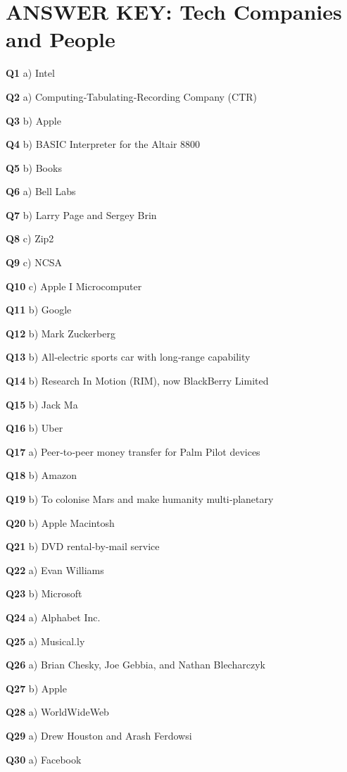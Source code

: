 \section{ANSWER KEY: Tech Companies and People}

\textbf{Q1} a) Intel\par
\textbf{Q2} a) Computing‑Tabulating‑Recording Company (CTR)\par
\textbf{Q3} b) Apple\par
\textbf{Q4} b) BASIC Interpreter for the Altair 8800\par
\textbf{Q5} b) Books\par
\textbf{Q6} a) Bell Labs\par
\textbf{Q7} b) Larry Page and Sergey Brin\par
\textbf{Q8} c) Zip2\par
\textbf{Q9} c) NCSA\par
\textbf{Q10} c) Apple I Microcomputer\par
\textbf{Q11} b) Google\par
\textbf{Q12} b) Mark Zuckerberg\par
\textbf{Q13} b) All‑electric sports car with long‑range capability\par
\textbf{Q14} b) Research In Motion (RIM), now BlackBerry Limited\par
\textbf{Q15} b) Jack Ma\par
\textbf{Q16} b) Uber\par
\textbf{Q17} a) Peer‑to‑peer money transfer for Palm Pilot devices\par
\textbf{Q18} b) Amazon\par
\textbf{Q19} b) To colonise Mars and make humanity multi‑planetary\par
\textbf{Q20} b) Apple Macintosh\par
\textbf{Q21} b) DVD rental‑by‑mail service\par
\textbf{Q22} a) Evan Williams\par
\textbf{Q23} b) Microsoft\par
\textbf{Q24} a) Alphabet Inc.\par
\textbf{Q25} a) Musical.ly\par
\textbf{Q26} a) Brian Chesky, Joe Gebbia, and Nathan Blecharczyk\par
\textbf{Q27} b) Apple\par
\textbf{Q28} a) WorldWideWeb\par
\textbf{Q29} a) Drew Houston and Arash Ferdowsi\par
\textbf{Q30} a) Facebook\par
